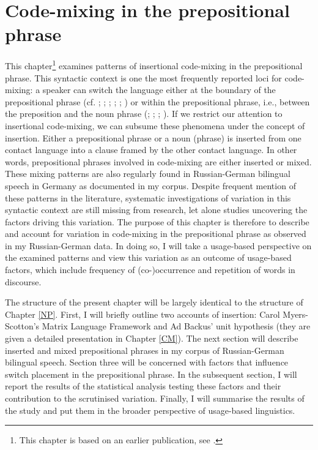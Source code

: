 \chapter{Code-mixing in the prepositional phrase}\label{PP}

This chapter\footnote{This chapter is based on an earlier publication, see \cite{reif-robinson}.} examines patterns of insertional code-mixing in the prepositional phrase. This syntactic context is one the most frequently reported loci for code-mixing: a speaker can switch the language either at the boundary of the prepositional phrase (cf. \citealt[314]{bentahila-davies-1983}; \citealt[271, 315]{boumans-syntax-1998}; \citealt[757]{clyne1987}; \citealt[169]{haust-codeswitching-1995}; \citealt[310]{pfaff-constraints-1979}; \citealt[208, 221--224]{treffers-daller-mixing-1994}) or within the prepositional phrase, i.e., between the preposition and the noun phrase (\citealt[315]{bentahila-davies-1983}; \citealt[602]{poplack-sometimes-1980}; \citealt[310]{pfaff-constraints-1979}; \citealt[173, 178]{stenson-1990}). If we restrict our attention to insertional code-mixing, we can subsume these phenomena under the concept of insertion. Either a prepositional phrase or a noun (phrase) is inserted from one contact language into a clause framed by the other contact language. In other words, prepositional phrases involved in code-mixing are either inserted or mixed. These mixing patterns are also regularly found in Russian-German bilingual speech in Germany as documented in my corpus. Despite frequent mention of these patterns in the literature, systematic investigations of  variation in this syntactic context are still missing from research, let alone studies uncovering the factors driving this variation. The purpose of this chapter is therefore to describe and account for variation in code-mixing in the prepositional phrase as observed in my Russian-German data. In doing so, I will take a usage-based perspective on the examined patterns and view this variation as an outcome of usage-based factors, which include frequency of (co-)occurrence and repetition of words in discourse.

The structure of the present chapter will be largely identical to the structure of Chapter \ref{NP}. First, I will briefly outline two accounts of insertion: Carol Myers-Scotton's Matrix Language Framework and Ad Backus' unit hypothesis (they are given a detailed presentation in Chapter \ref{CM}). The next section will describe inserted and mixed prepositional phrases in my corpus of Russian-German bilingual speech. Section three will be concerned with factors that influence switch placement in the prepositional phrase. In the subsequent section, I will report the results of the statistical analysis testing these factors and their contribution to the scrutinised variation. Finally, I will summarise the results of the study and put them in the broader perspective of usage-based linguistics.

